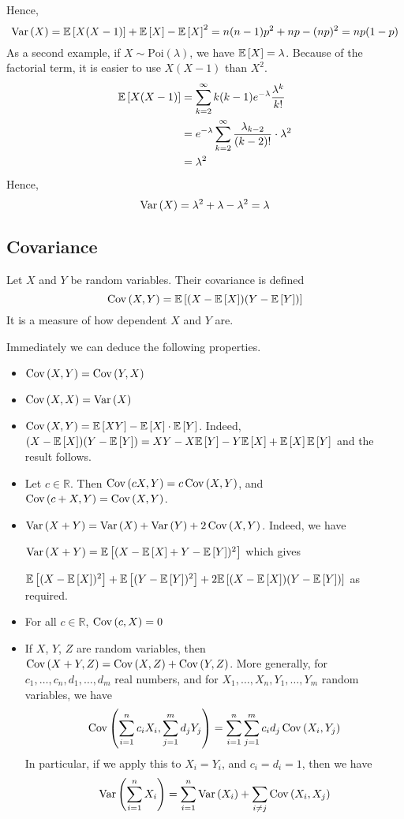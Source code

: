 Hence,
\[
	\Var{X} = \expect{X(X-1)} + \expect{X} - \expect{X}^2 = n(n-1)p^2 + np - (np)^2 = np(1-p)
\]
As a second example, if \(X \sim \text{Poi}(\lambda)\), we have \(\expect{X} = \lambda\).
Because of the factorial term, it is easier to use \(X(X-1)\) than \(X^2\).
\begin{align*}
	\expect{X(X-1)} & = \sum_{k=2}^\infty k(k-1) e^{-\lambda} \frac{\lambda^k}{k!}                  \\
	                & = e^{-\lambda} \sum_{k=2}^\infty \frac{\lambda_{k-2}}{(k-2)!} \cdot \lambda^2 \\
	                & = \lambda^2
\end{align*}
Hence,
\[
	\Var{X} = \lambda^2 + \lambda - \lambda^2 = \lambda
\]

\subsection{Covariance}
\begin{definition}
	Let \(X\) and \(Y\) be random variables.
	Their covariance is defined
	\[
		\Cov{X,Y} = \expect{(X - \expect{X})(Y - \expect{Y})}
	\]
	It is a measure of how dependent \(X\) and \(Y\) are.
\end{definition}
Immediately we can deduce the following properties.
\begin{itemize}
	\item \(\Cov{X,Y} = \Cov{Y,X}\)
	\item \(\Cov{X,X} = \Var{X}\)
	\item \(\Cov{X,Y} = \expect{XY} - \expect{X}\cdot\expect{Y}\).
	      Indeed, \((X - \expect{X})(Y - \expect{Y}) = XY - X\expect{Y} - Y\expect{X} + \expect{X}\expect{Y}\) and the result follows.
	\item Let \(c \in \mathbb R\).
	      Then \(\Cov{cX,Y} = c\Cov{X,Y}\), and \(\Cov{c + X,Y} = \Cov{X,Y}\).
	\item \(\Var{X + Y} = \Var{X} + \Var{Y} + 2\Cov{X,Y}\).
	      Indeed, we have

	      \(\Var{X + Y} = \expect{(X - \expect{X} + Y - \expect{Y})^2}\) which gives

	      \(\expect{(X - \expect{X})^2} + \expect{(Y - \expect{Y})^2} + 2\expect{(X - \expect{X})(Y - \expect{Y})}\) as required.
	\item For all \(c \in \mathbb R\), \(\Cov{c, X} = 0\)
	\item If \(X\), \(Y\), \(Z\) are random variables, then \(\Cov{X + Y,Z} = \Cov{X,Z} + \Cov{Y,Z}\).
	      More generally, for \(c_1, \dots, c_n, d_1, \dots, d_m\) real numbers, and for \(X_1, \dots, X_n, Y_1, \dots, Y_m\) random variables, we have
	      \[
		      \Cov{\sum_{i=1}^n c_i X_i,\sum_{j=1}^m d_j Y_j} = \sum_{i=1}^n \sum_{j=1}^m c_i d_j \Cov{X_i,Y_j}
	      \]
	      In particular, if we apply this to \(X_i = Y_i\), and \(c_i = d_i = 1\), then we have
	      \[
		      \Var{\sum_{i=1}^n X_i} = \sum_{i=1}^n \Var{X_i} + \sum_{i \neq j} \Cov{X_i,X_j}
	      \]
\end{itemize}

